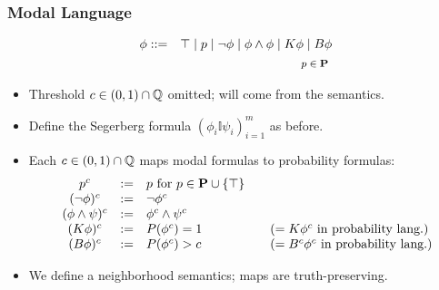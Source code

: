 \begin{frame}
  \frametitle{Modal Language}
  \begin{eqnarray*}
    \phi & ::= & 
    \top \mid p \mid \neg\phi \mid \phi\land\phi \mid
    K\phi \mid B\phi
    \\
    &&
    \text{\footnotesize 
      $p\in{\bf P}$
    }
  \end{eqnarray*}
  \begin{itemize}
  \item<+-> Threshold $c\in(0,1)\cap\mathbb{Q}$ omitted; will come
    from the semantics.

  \item<+-> Define the Segerberg formula
    $(\phi_i\mathbb{I}\psi_i)_{i=1}^m$ as before.

  \item<+-> Each $c\in(0,1)\cap\mathbb{Q}$ maps modal formulas
    to probability formulas:
    \[
    \begin{array}{ccl@{\qquad}l}
      p^c & := & p \text{ for } p\in\Prop\cup\{\top\}
      \\
      (\neg \phi)^c & := & \neg \phi^c 
      \\
      (\phi \land \psi)^c & := & \phi^c \land \psi^c 
      \\
      (K\phi)^c & := & P(\phi^c) = 1
      & (= K\phi^c \text{ in probability lang.})
      \\
      (B\phi)^c & := & \textstyle P(\phi^c) > c
      & (= B^c\phi^c \text{ in probability lang.})
    \end{array}
    \]

  \item<+-> We define a neighborhood semantics; maps are
    truth-preserving.
  \end{itemize}
\end{frame}

